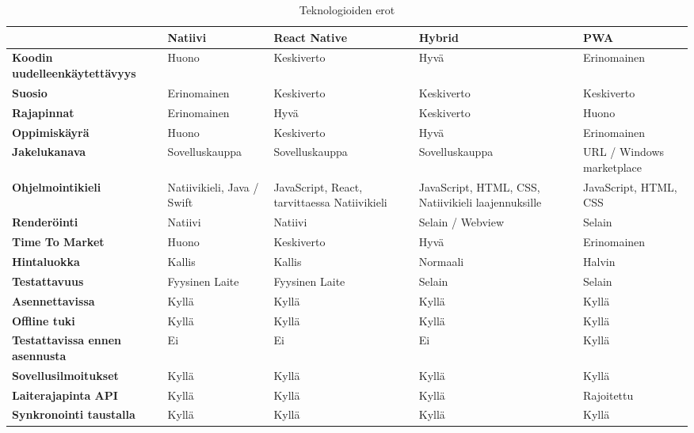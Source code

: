 \documentclass{tktltiki}
\begin{document}
\begin{landscape}
\begin{table}[h]
\centering
\begin{small}
\caption{ Teknologioiden erot \cite{biorn2017progressive} }
\begin{tabular}{|L{4cm}|L{4cm}|L{4cm}|L{4cm}| L{4cm}|}
\hline
\textbf{} &
\textbf{Natiivi} & 
\textbf{React Native} &
\textbf{Hybrid} & 
\textbf{PWA}
\\ \hline
\textbf{Koodin uudelleenkäytettävyys} & Huono &	Keskiverto & Hyvä & Erinomainen
\\ \hline
\textbf{Suosio} & Erinomainen & Keskiverto & Keskiverto & Keskiverto
\\ \hline
\textbf{Rajapinnat} & Erinomainen &	Hyvä & Keskiverto &	Huono
\\ \hline
\textbf{Oppimiskäyrä} & Huono &	Keskiverto & Hyvä &	Erinomainen
\\ \hline
\textbf{Jakelukanava} & Sovelluskauppa & Sovelluskauppa & Sovelluskauppa & URL / Windows marketplace
\\ \hline
\textbf{Ohjelmointikieli} & Natiivikieli, Java / Swift & JavaScript, React, tarvittaessa Natiivikieli &	JavaScript, HTML, CSS, Natiivikieli laajennuksille & JavaScript, HTML, CSS
\\ \hline
\textbf{Renderöinti} & Natiivi & Natiivi & Selain / Webview & Selain
\\ \hline
\textbf{Time To Market} & Huono	& Keskiverto & Hyvä & Erinomainen
\\ \hline
\textbf{Hintaluokka} & Kallis &	Kallis & Normaali &	Halvin
\\ \hline
\textbf{Testattavuus} & Fyysinen Laite & Fyysinen Laite & Selain & Selain
\\ \hline
\textbf{Asennettavissa} & Kyllä & Kyllä & Kyllä & Kyllä
\\ \hline
\textbf{Offline tuki} & Kyllä & Kyllä & Kyllä & Kyllä
\\ \hline
\textbf{Testattavissa ennen asennusta} & Ei & Ei & Ei & Kyllä
\\ \hline
\textbf{Sovellusilmoitukset} & Kyllä & Kyllä & Kyllä & Kyllä
\\ \hline
\textbf{Laiterajapinta API} & Kyllä & Kyllä & Kyllä & Rajoitettu
\\ \hline
\textbf{Synkronointi taustalla} & Kyllä & Kyllä & Kyllä & Kyllä
\\ \hline
\end{tabular}
\label{table:teknologiaerot}
\end{small}
\end{table}

\end{landscape}
\end{document}
